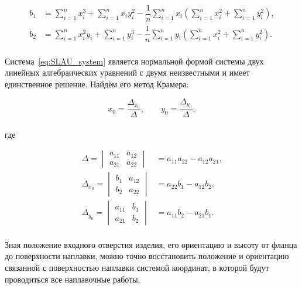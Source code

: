 \begin{align*}
    b_1 &= \sum_{i=1}^{n} x_i^3 + \sum_{i=1}^{n} x_i y_i^2
    - \dfrac{1}{n} \sum_{i=1}^{n} x_i \left(
    \sum_{i=1}^{n} x_i^2 + \sum_{i=1}^{n} y_i^2 \right), \\
    b_2 &= \sum_{i=1}^{n} x_i^2 y_i + \sum_{i=1}^{n} y_i^3
    - \dfrac{1}{n} \sum_{i=1}^{n} y_i \left(
    \sum_{i=1}^{n} x_i^2 + \sum_{i=1}^{n} y_i^2 \right).
\end{align*} \\

Система~\ref{eq:SLAU_system} является нормальной формой системы двух линейных алгебраических уравнений с двумя неизвестными и имеет единственное решение.
Найдём его метод Крамера:

\begin{equation*}
    x_0 = \dfrac{\Delta_{x_0}}{\Delta}, \qquad
    y_0 = \dfrac{\Delta_{y_0}}{\Delta},
\end{equation*} \\
где

\begin{align*}
    \Delta = \begin{vmatrix}
                 a_{11} & a_{12} \\
                 a_{21} & a_{22}
    \end{vmatrix} &= a_{11} a_{22} - a_{12} a_{21}, \\
    \Delta_{x_0} = \begin{vmatrix}
                       b_1 & a_{12} \\
                       b_2 & a_{22}
    \end{vmatrix} &= a_{22} b_1 - a_{12} b_2, \\
    \Delta_{y_0} = \begin{vmatrix}
                       a_{11} & b_1 \\
                       a_{21} & b_2
    \end{vmatrix} &= a_{11} b_2 - a_{21} b_1.
\end{align*} \\

Зная положение входного отверстия изделия, его ориентацию и высоту от фланца до поверхности наплавки, можно точно восстановить положение и ориентацию связанной с поверхностью наплавки системой координат, в которой будут проводиться все наплавочные работы.


